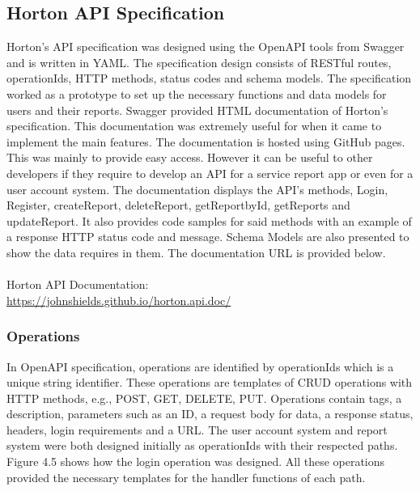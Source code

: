 \subsection{Horton API Specification}
Horton's API specification was designed using the OpenAPI tools from Swagger and is written in YAML. The specification design consists of RESTful routes, operationIds, HTTP methods, status codes and schema models. 
The specification worked as a prototype to set up the necessary functions and data models for users and their reports. 
Swagger provided HTML documentation of Horton's specification. This documentation was extremely useful for when it came to implement the main features. The documentation is hosted using GitHub pages. This was mainly to provide easy access. However it can be useful to other developers if they require to develop an API for a service report app or even for a user account system. The documentation displays the API's methods, Login, Register, createReport, deleteReport, getReportbyId, getReports and updateReport. It also provides code samples for said methods with an example of a response HTTP status code and message. Schema Models are also presented to show the data requires in them. The documentation URL is provided below.
\\\\ Horton API Documentation: \\ 
\url{https://johnshields.github.io/horton.api.doc/}

\subsubsection{Operations}
In OpenAPI specification, operations are identified by operationIds which is a unique string identifier. These operations are templates of CRUD operations with HTTP methods, e.g., POST, GET, DELETE, PUT. Operations contain tags, a description, parameters such as an ID, a request body for data, a response status, headers, login requirements and a URL. The user account system and report system were both designed initially as operationIds with their respected paths. Figure 4.5 shows how the login operation was designed. All these operations provided the necessary templates for the handler functions of each path. 

